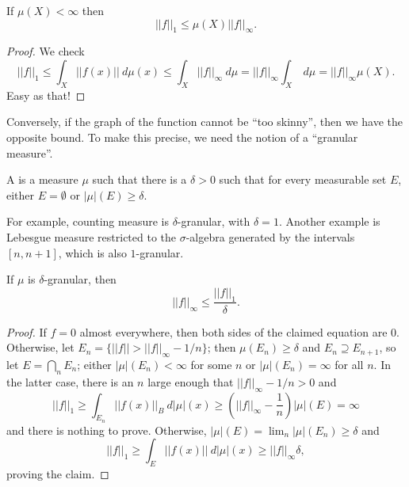 \begin{lemma}
If $\mu(X) < \infty$ then
\[||f||_{1} \leq \mu(X) ||f||_{\infty}.\]
\end{lemma}
\begin{proof}
We check
\[||f||_{1} \leq \int_{X} ||f(x)||~d\mu(x) \leq \int_{X} ||f||_{\infty} ~d\mu = ||f||_{\infty} \int_{X} ~d\mu = ||f||_{\infty} \mu(X).\]
Easy as that!
\end{proof}

\begin{subsec}
Conversely, if the graph of the function cannot be ``too skinny'', then we have the opposite bound.
To make this precise, we need the notion of a ``granular measure''.
\end{subsec}

\begin{definition}
A  is a measure $\mu$ such that there is a $\delta > 0$ such that for every measurable set $E$, either $E = \emptyset$ or $|\mu|(E) \geq \delta$.
\end{definition}

\begin{subsec}
For example, counting measure is $\delta$-granular, with $\delta = 1$.
Another example is Lebesgue measure restricted to the $\sigma$-algebra generated by the intervals $[n, n+1]$, which is also $1$-granular.
\end{subsec}

\begin{lemma}
If $\mu$ is $\delta$-granular, then
\[||f||_{\infty} \leq \frac{||f||_{1}}{\delta}.\]
\end{lemma}
\begin{proof}
If $f = 0$ almost everywhere, then both sides of the claimed equation are $0$.
Otherwise, let $E_{n} = \{||f|| > ||f||_{\infty} - 1/n\}$; then $\mu(E_{n}) \geq \delta$ and $E_{n} \supseteq E_{n+1}$, so let $E = \bigcap_{n} E_{n}$; either $|\mu|(E_{n}) < \infty$ for some $n$ or $|\mu|(E_{n}) = \infty$ for all $n$.
In the latter case, there is an $n$ large enough that $||f||_{\infty} - 1/n > 0$ and
\[||f||_{1} \geq \int_{E_{n}} ||f(x)||_{B} ~d|\mu|(x) \geq (||f||_{\infty} - \frac{1}{n}) |\mu|(E) = \infty\]
and there is nothing to prove. Otherwise, $|\mu|(E) = \lim_{n} |\mu|(E_{n}) \geq \delta$ and
\[||f||_{1} \geq \int_{E} ||f(x)||~d|\mu|(x) \geq ||f||_{\infty} \delta,\]
proving the claim.
\end{proof}


